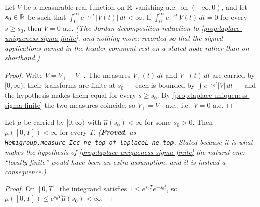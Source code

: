 \begin{corollary}\label{cor:laplace-uniqueness-signed}
Let $V$ be a measurable real function on $\mathbb{R}$ vanishing a.e.\ on $(-\infty, 0)$, and let
$s_0 \in \mathbb{R}$ be such that $\int_0^\infty e^{-s_0 t}\,|V(t)|\,dt < \infty$. If
$\int_0^\infty e^{-st}\,V(t)\,dt = 0$ for every $s \ge s_0$, then $V = 0$ a.e.
\statusT\quad\emph{(The Jordan-decomposition reduction to
\ref{prop:laplace-uniqueness-sigma-finite}, and nothing more; recorded so that the signed
applications named in the header comment rest on a stated node rather than on shorthand.)}
\end{corollary}

\begin{proof}
Write $V = V_+ - V_-$. The measures $V_+(t)\,dt$ and $V_-(t)\,dt$ are carried by
$[0,\infty)$, their transforms are finite at $s_0$ --- each is bounded by
$\int e^{-s_0 t}|V|\,dt$ --- and the hypothesis makes them equal for every $s \ge s_0$. By
\ref{prop:laplace-uniqueness-sigma-finite} the two measures coincide, so
$V_+ = V_-$ a.e., i.e.\ $V = 0$ a.e.
\end{proof}

\begin{lemma}\label{lem:laplace-local-finiteness}
\leanok
Let $\mu$ be carried by $[0,\infty)$ with $\hat\mu(s_0) < \infty$ for some $s_0 > 0$. Then
$\mu([0,T]) < \infty$ for every $T$.
\statusT\quad\emph{(\textbf{Proved}, as
\texttt{Hemigroup.measure\_Icc\_ne\_top\_of\_laplaceL\_ne\_top}. Stated because it is what makes
the hypothesis of \ref{prop:laplace-uniqueness-sigma-finite} the natural one: ``locally finite''
would have been an extra assumption, and it is instead a consequence.)}
\end{lemma}

\begin{proof}
\leanok
On $[0,T]$ the integrand satisfies $1 \le e^{s_0 T} e^{-s_0 t}$, so
$\mu([0,T]) \le e^{s_0T}\hat\mu(s_0) < \infty$.
\end{proof}

